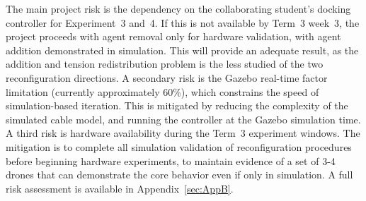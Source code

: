 The main project risk is the dependency on the collaborating student's docking controller for Experiment~3 and~4. If this is not available by Term~3 week~3, the project proceeds with agent removal only for hardware validation, with agent addition demonstrated in simulation. This will provide an adequate result, as the addition and tension redistribution problem is the less studied of the two reconfiguration directions. A secondary risk is the Gazebo real-time factor limitation (currently approximately 60\%), which constrains the speed of simulation-based iteration. This is mitigated by reducing the complexity of the simulated cable model, and running the controller at the Gazebo simulation time. A third risk is hardware availability during the Term~3 experiment windows. The mitigation is to complete all simulation validation of reconfiguration procedures before beginning hardware experiments, to maintain evidence of a set of 3-4 drones that can demonstrate the core behavior even if only in simulation. A full risk assessment is available in Appendix~\ref{sec:AppB}.
